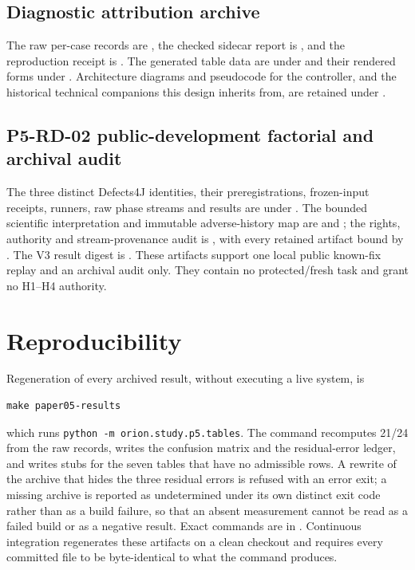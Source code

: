 \subsection*{Diagnostic attribution archive}

The raw per-case records are , the checked sidecar report is , and the reproduction receipt is . The generated table data are under  and their rendered forms under . Architecture diagrams and pseudocode for the controller, and the historical technical companions this design inherits from, are retained under .

\subsection*{P5-RD-02 public-development factorial and archival audit}

The three distinct Defects4J identities, their preregistrations, frozen-input
receipts, runners, raw phase streams and results are under
.  The bounded
scientific interpretation and immutable adverse-history map are
 and ; the rights,
authority and stream-provenance audit is , with every
retained artifact bound by .  The V3 result digest is
.
These artifacts support one local public known-fix replay and an archival audit
only.  They contain no protected/fresh task and grant no H1--H4 authority.

\section{Reproducibility}
\label{sec:reproducibility}

Regeneration of every archived result, without executing a live system, is

\begin{verbatim}
make paper05-results
\end{verbatim}

\noindent which runs \texttt{python -m orion.study.p5.tables}. The command recomputes 21/24 from the raw records, writes the confusion matrix and the residual-error ledger, and writes stubs for the seven tables that have no admissible rows. A rewrite of the archive that hides the three residual errors is refused with an error exit; a missing archive is reported as undetermined under its own distinct exit code rather than as a build failure, so that an absent measurement cannot be read as a failed build or as a negative result. Exact commands are in . Continuous integration regenerates these artifacts on a clean checkout and requires every committed file to be byte-identical to what the command produces.

